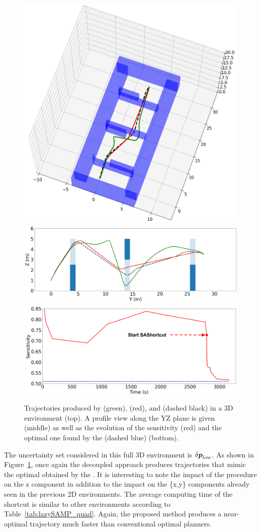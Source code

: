 \begin{figure}[htp]
\centering
    \includegraphics[width=0.7\linewidth]{figures/samp/3D_full_view.png}
    \includegraphics[width=0.7\linewidth]{figures/samp/3D_ZYprofile.png}
    \includegraphics[width=0.7\linewidth]{figures/samp/3D_sensi.png}
    \caption{Trajectories produced by  (green),  (red), and  (dashed black) in a 3D environment (top). 
    A profile view along the YZ plane is given (middle) as well as the evolution of the sensitivity (red) and the optimal one found by the  (dashed blue) (bottom).}
    \label{fig:3D}
\end{figure}

The uncertainty set considered in this full 3D environment is $\delta\boldsymbol{p}_{low}$.
As shown in Figure~\ref{fig:3D}, once again the decoupled approach produces trajectories that mimic the optimal obtained by the .
It is interesting to note the impact of the  procedure on the z component in addition to the impact on the \{x,y\} components already seen in the previous 2D environments.
The average computing time of the shortcut is similar to other environments according to Table~\ref{tab:lazySAMP_quad}.
Again, the proposed method produces a near-optimal trajectory much faster than conventional optimal planners.

